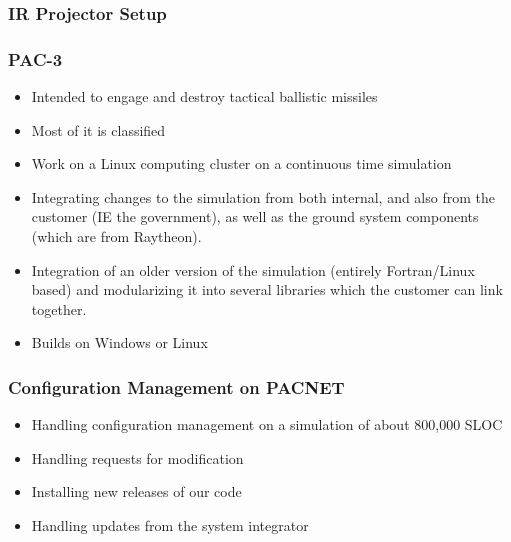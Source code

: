 \documentclass[aspectratio=169]{beamer}
\begin{document}
\begin{frame}
  \frametitle{IR Projector Setup}

\end{frame}

\begin{frame}
  \frametitle{PAC-3} %
  \begin{itemize}
  \item Intended to engage and destroy tactical ballistic missiles
  \item Most of it is classified
  \item Work on a Linux computing cluster on a continuous time simulation
  \item Integrating changes to the simulation from both internal, and also from the customer (IE the government), as well as the ground system components (which are from Raytheon).
  \item Integration of an older version of the simulation (entirely Fortran/Linux based) and modularizing it into several libraries which the customer can link together.
  \item Builds on Windows or Linux
  \end{itemize}
\end{frame}


\begin{frame}
  \frametitle{Configuration Management on PACNET}
  \begin{itemize}
  \item Handling configuration management on a simulation of about 800,000 SLOC
  \item Handling requests for modification
  \item Installing new releases of our code
  \item Handling updates from the system integrator
  \end{itemize}
\end{frame}


\end{document}
